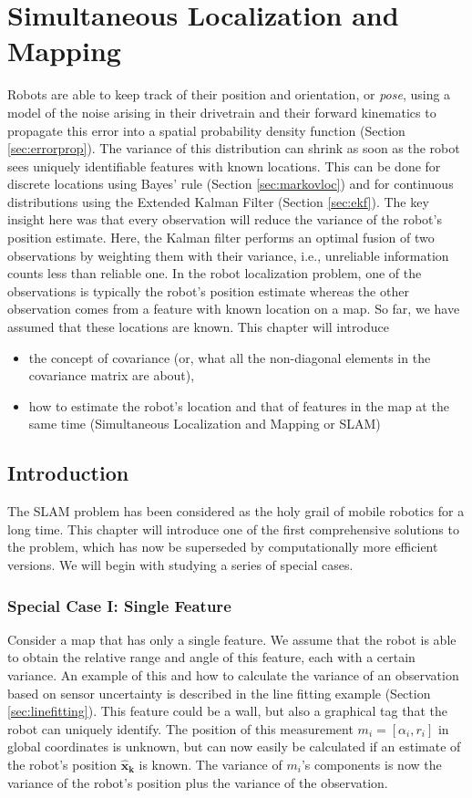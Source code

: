 \chapter{Simultaneous Localization and Mapping}\label{chap:slam}
Robots are able to keep track of their position and orientation, or \emph{pose}, using a model of the noise arising in their drivetrain and their forward kinematics to propagate this error into a spatial probability density function (Section \ref{sec:errorprop}). The variance of this distribution can shrink as soon as the robot sees uniquely identifiable features with known locations. This can be done for discrete locations using Bayes' rule (Section \ref{sec:markovloc}) and for continuous distributions using the Extended Kalman Filter (Section \ref{sec:ekf}). The key insight here was that every observation will reduce the variance of the robot's position estimate. Here, the Kalman filter performs an optimal fusion of two observations by weighting them with their variance, i.e., unreliable information counts less than reliable one. In the robot localization problem, one of the observations is typically the robot's position estimate whereas the other observation comes from a feature with known location on a map. So far, we have assumed that these locations are known. This chapter will introduce

\begin{itemize}
\item the concept of covariance (or, what all the non-diagonal elements in the covariance matrix are about),
\item how to estimate the robot's location and that of features in the map at the same time (Simultaneous Localization and Mapping or SLAM)
\end{itemize}

\section{Introduction}
The SLAM problem has been considered as the holy grail of mobile robotics for a long time. This chapter will introduce one of the first comprehensive solutions to the problem, which has now be superseded by computationally more efficient versions. We will begin with studying a series of special cases.

\subsection{Special Case I: Single Feature}
Consider a map that has only a single feature. We assume that the robot is able to obtain the relative range and angle of this feature, each with a certain variance. An example of this and how to calculate the variance of an observation based on sensor uncertainty is described in the line fitting example (Section \ref{sec:linefitting}). This feature could be a wall, but also a graphical tag that the robot can uniquely identify. The position of this measurement $m_i=[\alpha_i,r_i]$  in global coordinates is unknown, but can now easily be calculated if an estimate of the robot's position $\boldsymbol{\hat{x}_k}$ is known.  The variance of $ m_i$'s components is now the variance of the robot's position plus the variance of the observation.


